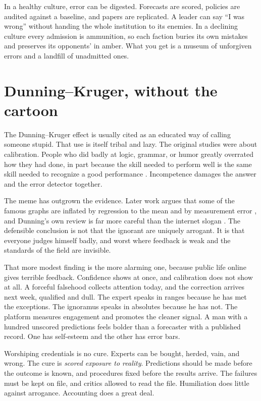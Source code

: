 \documentclass[12pt,a4paper]{book}
\begin{document}
In a healthy culture, error can be digested. Forecasts are scored, policies are audited against a baseline, and papers are replicated. A leader can say ``I was wrong'' without handing the whole institution to its enemies. In a declining culture every admission is ammunition, so each faction buries its own mistakes and preserves its opponents' in amber. What you get is a museum of unforgiven errors and a landfill of unadmitted ones.

\section{Dunning--Kruger, without the cartoon}

The Dunning--Kruger effect is usually cited as an educated way of calling someone stupid. That use is itself tribal and lazy. The original studies were about calibration. People who did badly at logic, grammar, or humor greatly overrated how they had done, in part because the skill needed to perform well is the same skill needed to recognize a good performance \cite{Kruger1999-mv}. Incompetence damages the answer and the error detector together.

The meme has outgrown the evidence. Later work argues that some of the famous graphs are inflated by regression to the mean and by measurement error \cite{GignacZajenkowski2020}, and Dunning's own review is far more careful than the internet slogan \cite{Dunning2011-hf}. The defensible conclusion is not that the ignorant are uniquely arrogant. It is that everyone judges himself badly, and worst where feedback is weak and the standards of the field are invisible.

That more modest finding is the more alarming one, because public life online gives terrible feedback. Confidence shows at once, and calibration does not show at all. A forceful falsehood collects attention today, and the correction arrives next week, qualified and dull. The expert speaks in ranges because he has met the exceptions. The ignoramus speaks in absolutes because he has not. The platform measures engagement and promotes the cleaner signal. A man with a hundred unscored predictions feels bolder than a forecaster with a published record. One has self-esteem and the other has error bars.

Worshiping credentials is no cure. Experts can be bought, herded, vain, and wrong. The cure is \emph{scored exposure to reality}. Predictions should be made before the outcome is known, and procedures fixed before the results arrive. The failures must be kept on file, and critics allowed to read the file. Humiliation does little against arrogance. Accounting does a great deal.
\end{document}
